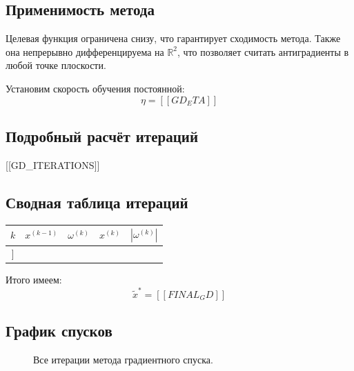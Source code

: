 \documentclass[12pt]{article}
\begin{document}
\subsection{Применимость метода}

Целевая функция ограничена снизу, что гарантирует сходимость метода. Также она непрерывно дифференцируема на \( \mathbb{R}^2 \), что позволяет считать антиградиенты в любой точке плоскости.

Установим скорость обучения постоянной:
\[
  \eta = [[GD_ETA]]
\]

\subsection{Подробный расчёт итераций}
[[GD_ITERATIONS]]

\subsection{Сводная таблица итераций}
\begin{table}[H]
\centering
\begin{tabular}{|c|c|c|c|c|}
\hline
$k$ & $x^{(k-1)}$ & $\omega^{(k)}$ & $x^{(k)}$ & $|\omega^{(k)}|$ \\
\hline
[[GD_TABLE]]
\end{tabular}
\end{table}

Итого имеем:
\[
  \tilde{x}^{\ast}=[[FINAL_GD]]
\]

\subsection{График спусков}

\begin{figure}[H]
  \centering
  \caption{Все итерации метода градиентного спуска.}
  \end{figure}
\end{document}
